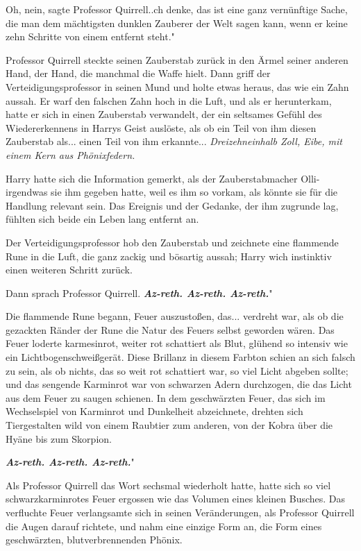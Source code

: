 \glqq{}Oh, nein\grqq{}, sagte Professor Quirrell.\grqq{}.ch denke, das ist eine
ganz vernünftige Sache, die man dem mächtigsten dunklen Zauberer der Welt sagen
kann, wenn er keine zehn Schritte von einem entfernt steht."

Professor Quirrell steckte seinen Zauberstab zurück in den Ärmel seiner anderen
Hand, der Hand, die manchmal die Waffe hielt. Dann griff der
Verteidigungsprofessor in seinen Mund und holte etwas heraus, das wie ein Zahn
aussah. Er warf den falschen Zahn hoch in die Luft, und als er herunterkam,
hatte er sich in einen Zauberstab verwandelt, der ein seltsames Gefühl des
Wiedererkennens in Harrys Geist auslöste, als ob ein Teil von ihm diesen
Zauberstab als... einen Teil von ihm erkannte... \emph{Dreizehneinhalb Zoll,
Eibe, mit einem Kern aus Phönixfedern.}

Harry hatte sich die Information gemerkt, als der Zauberstabmacher
Olli-irgendwas sie ihm gegeben hatte, weil es ihm so vorkam, als könnte sie für
die Handlung relevant sein. Das Ereignis und der Gedanke, der ihm zugrunde lag,
fühlten sich beide ein Leben lang entfernt an.

Der Verteidigungsprofessor hob den Zauberstab und zeichnete eine flammende Rune
in die Luft, die ganz zackig und bösartig aussah; Harry wich instinktiv einen
weiteren Schritt zurück.

Dann sprach Professor Quirrell. \glqq{}\textbf{\emph{Az-reth. Az-reth.
Az-reth.}}"

Die flammende Rune begann, Feuer auszustoßen, das... verdreht war, als ob die
gezackten Ränder der Rune die Natur des Feuers selbst geworden wären. Das Feuer
loderte karmesinrot, weiter rot schattiert als Blut, glühend so intensiv wie ein
Lichtbogenschweißgerät. Diese Brillanz in diesem Farbton schien an sich falsch
zu sein, als ob nichts, das so weit rot schattiert war, so viel Licht abgeben
sollte; und das sengende Karminrot war von schwarzen Adern durchzogen, die das
Licht aus dem Feuer zu saugen schienen. In dem geschwärzten Feuer, das sich im
Wechselspiel von Karminrot und Dunkelheit abzeichnete, drehten sich
Tiergestalten wild von einem Raubtier zum anderen, von der Kobra über die Hyäne
bis zum Skorpion.

\glqq{}\textbf{\emph{Az-reth. Az-reth. Az-reth.}}"

Als Professor Quirrell das Wort sechsmal wiederholt hatte, hatte sich so viel
schwarzkarminrotes Feuer ergossen wie das Volumen eines kleinen Busches. Das
verfluchte Feuer verlangsamte sich in seinen Veränderungen, als Professor
Quirrell die Augen darauf richtete, und nahm eine einzige Form an, die Form
eines geschwärzten, blutverbrennenden Phönix.

